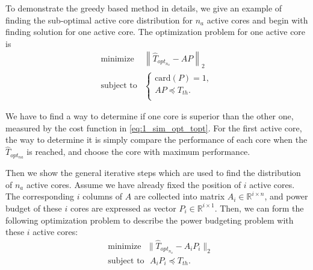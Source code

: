 To demonstrate the greedy based method in details, we give an example of finding the sub-optimal active core distribution for $n_{a}$ active cores and begin with finding solution for one active core. The optimization problem for one active core is
\begin{equation}\label{eq:1_sim_opt_topt}
\begin{split}
\text{minimize } &  \left \| \hat{T}_{opt_{n_{a}}} - AP \right \|_{2}\\
\text{subject to} &\left\{
\begin{array}{lr}
\text{card}(P) = 1,\\
AP \preceq T_{th}.\\
\end{array}
\right.
\end{split}
\end{equation}

We have to find a way to determine if one core is superior than the other one, measured by the cost function in \eqref{eq:1_sim_opt_topt}. For the first active core, the way to determine it is simply compare the performance of each core when the $\hat{T}_{opt_{na}}$ is reached, and choose the core with maximum performance.

Then we show the general iterative steps which are used to find the distribution of $n_{a}$ active cores. Assume we have already fixed the position of $i$ active cores. The corresponding $i$ columns of $A$ are collected into
matrix $A_i \in \mathbb{R}^{i \times n}$, and power budget of these $i$
cores are expressed as vector $P_i \in \mathbb{R}^{i \times 1}$. Then,
we can form the following optimization problem to describe the power
budgeting problem with these $i$ active cores:
\begin{equation}\label{eq:temp_ss_i_pb}
  \begin{split}
    &\text{minimize~~} \|\hat{T}_{opt_{n_{a}}}-A_i P_i\|_2\\
    &\text{subject to~~} A_i P_i\preceq T_{th}.
  \end{split}
\end{equation}

